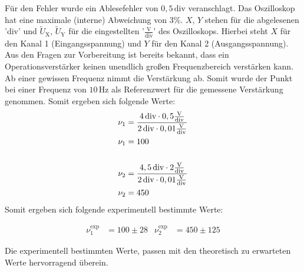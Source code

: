Für den Fehler wurde ein Ablesefehler von $0,5\,\text{div}$ veranschlagt.
Das Oszilloskop hat eine maximale (interne) Abweichung von $3\%$.
$X$, $Y$ stehen für die abgelesenen 'div' und $\tilde{U}_\text{X}$, $\tilde{U}_\text{Y}$ für die eingestellten '$\frac{\text{V}}{\text{div}}$' des Oszilloskops.
Hierbei steht $X$ für den Kanal 1 (Eingangsspannung) und $Y$ für den Kanal 2 (Ausgangsspannung).\\

Aus den Fragen zur Vorbereitung ist bereits bekannt, dass ein Operationsverstärker keinen unendlich großen Frequenzbereich verstärken kann.
Ab einer gewissen Frequenz nimmt die Verstärkung ab.
Somit wurde der Punkt bei einer Frequenz von $10\,\text{Hz}$ als Referenzwert für die gemessene Verstärkung genommen.
Somit ergeben sich folgende Werte:
\begin{align}
    \nu_1&=\frac{4\,\text{div}\cdot0,5\frac{\text{V}}{\text{div}}}{2\,\text{div}\cdot0,01\frac{\text{V}}{\text{div}}}\\
    \nu_1&=100\\\notag\\
    \nu_2&=\frac{4,5\,\text{div}\cdot2\frac{\text{V}}{\text{div}}}{2\,\text{div}\cdot0,01\frac{\text{V}}{\text{div}}}\\
    \nu_2&=450
\end{align}
Somit ergeben sich folgende experimentell bestimmte Werte:
\begin{framed}
    \begin{align}
        \nu_1^\text{exp}&=100\pm28&\nu_2^\text{exp}&=450\pm125
    \end{align}
\end{framed}
Die experimentell bestimmten Werte, passen mit den theoretisch zu erwarteten Werte hervorragend überein.\newpage
